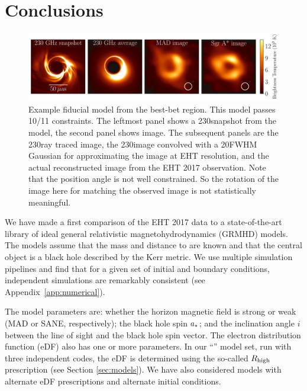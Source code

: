 \section{Conclusions}
\label{sec:conclusions}

\begin{figure}
  \centering
  \includegraphics[width=\textwidth]{figures/bestbet_imgs.pdf}
  \caption{Example fiducial model from the best-bet region.  This model passes 10/11 constraints.  
    The leftmost panel shows a 230\GHz snapshot from the model, the second panel shows  image.
    The subsequent panels are the 230\GHz ray traced image,
    the 230\GHz image convolved with a 20\uas FWHM Gaussian for approximating the image at EHT resolution, and
    the actual reconstructed image from the EHT 2017 observation.
    Note that the position angle is not well constrained.
    So the rotation of the image here for matching the observed image is not statistically meaningful.}
  \label{fig:bestbet_imgs}
\end{figure}

We have made a first comparison of the EHT 2017 \sgra data to a state-of-the-art library of ideal general relativistic magnetohydrodynamics (GRMHD) models.
The models assume that the mass and distance to \sgra are known and that the central object is a black hole described by the Kerr metric.
We use multiple simulation pipelines and find that for a given set of initial and boundary conditions, independent simulations are remarkably consistent (see Appendix~\ref{app:numerical}).

The model parameters are: whether the horizon magnetic field is strong or weak (MAD or SANE, respectively); the black hole spin $a_*$; and the inclination angle $i$ between the line of sight and the black hole spin vector.
The electron distribution function (eDF) also has one or more parameters.
In our ``\fiducial'' model set, run with three independent codes, the eDF is determined using the so-called $R_\mathrm{high}$ prescription (see Section \ref{sec:models}).
We have also considered \extended models with alternate eDF prescriptions and alternate initial conditions.

